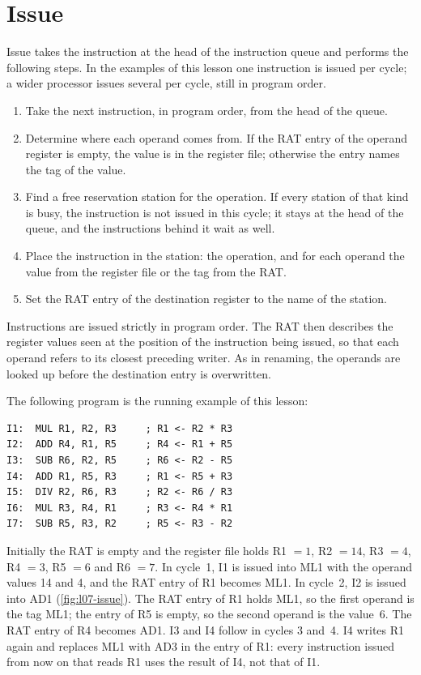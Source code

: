 \documentclass[../main.tex]{subfiles}
\begin{document}
\section{Issue}
\label{sec:l07-issue}

Issue takes the instruction at the head of the instruction queue and performs
the following steps.  In the
examples of this lesson one instruction is issued per cycle; a wider
processor issues several per cycle, still in program order.
\begin{enumerate}
  \item Take the next instruction, in program order, from the head of the
    queue.
  \item Determine where each operand comes from.  If the RAT entry of the
    operand register is empty, the value is in the register file; otherwise
    the entry names the tag of the value.
  \item Find a free reservation station for the operation.  If every station
    of that kind is busy, the instruction is not issued in this cycle; it
    stays at the head of the queue, and the instructions behind it wait as
    well.
  \item Place the instruction in the station: the operation, and for each
    operand the value from the register file or the tag from the RAT.
  \item Set the RAT entry of the destination register to the name of the
    station.
\end{enumerate}

Instructions are issued strictly in program order.  The RAT then describes the
register values seen at the position of the instruction being issued, so that
each operand refers to its closest preceding writer.  As in renaming, the
operands are looked up before the destination entry is
overwritten.

\begin{example}
  \label{ex:l07-program}
  The following program is the running example of this lesson:
  \begin{lstlisting}[language={[x86masm]Assembler}, numbers=none]
I1:  MUL R1, R2, R3     ; R1 <- R2 * R3
I2:  ADD R4, R1, R5     ; R4 <- R1 + R5
I3:  SUB R6, R2, R5     ; R6 <- R2 - R5
I4:  ADD R1, R5, R3     ; R1 <- R5 + R3
I5:  DIV R2, R6, R3     ; R2 <- R6 / R3
I6:  MUL R3, R4, R1     ; R3 <- R4 * R1
I7:  SUB R5, R3, R2     ; R5 <- R3 - R2
\end{lstlisting}
  Initially the RAT is empty and the register file holds R1 $=1$,
  R2 $=14$, R3 $=4$, R4 $=3$, R5 $=6$ and R6 $=7$.  In cycle~1, I1 is issued
  into ML1 with the operand values 14 and 4, and the RAT entry of R1 becomes
  ML1.  In cycle~2, I2 is issued into AD1 (\cref{fig:l07-issue}).  The RAT
  entry of R1 holds ML1, so the first operand is the tag ML1; the entry of R5
  is empty, so the second operand is the value~6.  The RAT entry of R4 becomes
  AD1.  I3 and I4 follow in cycles 3 and~4.  I4 writes R1 again and replaces
  ML1 with AD3 in the entry of R1: every instruction issued from now on that
  reads R1 uses the result of I4, not that of I1.
\end{example}
\end{document}
